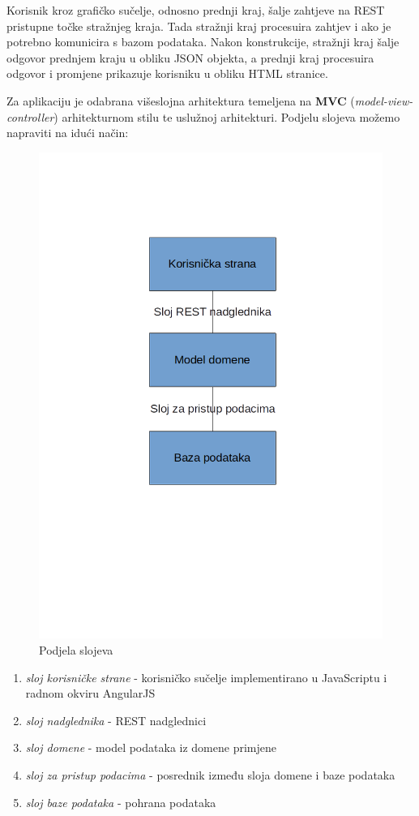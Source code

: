 	Korisnik kroz grafičko sučelje, odnosno prednji kraj, šalje zahtjeve na REST pristupne točke stražnjeg kraja. Tada stražnji kraj procesuira zahtjev i ako je potrebno komunicira s bazom podataka. Nakon konstrukcije, stražnji kraj šalje odgovor prednjem kraju u obliku JSON objekta, a prednji kraj procesuira odgovor i promjene prikazuje korisniku u obliku HTML stranice. 
	
	Za aplikaciju je odabrana višeslojna arhitektura temeljena na \textbf{MVC} (\textit{model-view-controller}) arhitekturnom stilu te uslužnoj arhitekturi. Podjelu slojeva možemo napraviti na idući način:
	\begin{figure}[H]
		\includegraphics[scale=0.3]{slike/slojevita_arhitektura.png}
		\centering
		\caption{Podjela slojeva}
		\label{fig:podjela_slojeva}
	\end{figure}
	\begin{enumerate}
		\item \textit{sloj korisničke strane} - korisničko sučelje implementirano u JavaScriptu i radnom okviru AngularJS
		\item \textit{sloj nadglednika} - REST nadglednici 
		\item \textit{sloj domene} - model podataka iz domene primjene
		\item \textit{sloj za pristup podacima} - posrednik između sloja domene i baze podataka
		\item \textit{sloj baze podataka} - pohrana podataka
	\end{enumerate}
	
